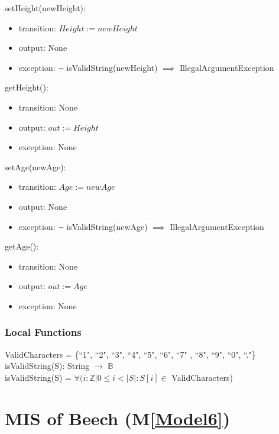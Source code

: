 \documentclass[12pt, titlepage]{article}
\newcommand{\mref}[1]{M\ref{#1}}
\begin{document}
\noindent setHeight(newHeight):
\begin{itemize}
\item transition: $\mathit{Height := newHeight}$
\item output: None
\item exception: $\neg$ isValidString(newHeight) $\implies$
IllegalArgumentException
\end{itemize}

\noindent getHeight():
\begin{itemize}
\item transition: None
\item output: $\mathit{out := Height}$
\item exception: None
\end{itemize}

\noindent setAge(newAge):
\begin{itemize}
\item transition: $\mathit{Age := newAge}$
\item output: None
\item exception: $\neg$ isValidString(newAge) $\implies$
IllegalArgumentException
\end{itemize}

\noindent getAge():
\begin{itemize}
\item transition: None
\item output: $\mathit{out := Age}$
\item exception: None
\end{itemize}

\subsubsection{Local Functions}
ValidCharacters = \{``1", ``2", ``3", ``4", ``5", ``6", ``7"
, ``8", ``9", ``0", ``."\}\\

\noindent isValidString(S): String $\rightarrow$ $\mathbb{B}$ \\

\noindent isValidString(S) = $\forall(i : \mathbb{Z} | 0 \leq
i < |S| : S[i] \in $ ValidCharacters)

\newpage

\renewcommand{\tn}{Beech }
\renewcommand{\tmn}{Beech}
\renewcommand{\constn}{Beech}

\section{MIS of \tn (\mref{Model6})}
\end{document}
